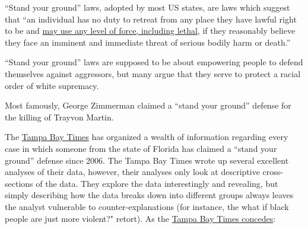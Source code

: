 \documentclass[12pt,article]{article}
\begin{document}
``Stand your ground'' laws, adopted by most US states, are laws which
suggest that ``an individual has no duty to retreat from any place they
have lawful right to be and
\href{http://en.wikipedia.org/wiki/Stand-your-ground_law}{may use any
level of force, including lethal}, if they reasonably believe they face
an imminent and immediate threat of serious bodily harm or death.''

``Stand your ground'' laws are supposed to be about empowering people to
defend themselves against aggressors, but many argue that they serve to
protect a racial order of white supremacy.

Most famously, George Zimmerman claimed a ``stand your ground'' defense
for the killing of Trayvon Martin.

The \href{http://www.tampabay.com/stand-your-ground-law}{Tampa Bay
Times} has organized a wealth of information regarding every case in
which someone from the state of Florida has claimed a ``stand your
ground'' defense since 2006. The Tampa Bay Times wrote up several
excellent analyses of their data, however, their analyses only look at
descriptive cross-sections of the data. They explore the data
interestingly and revealing, but simply describing how the data breaks
down into different groups always leaves the analyst vulnerable to
counter-explanations (for instance, the what if black people are just
more violent?" retort). As the
\href{http://www.tampabay.com/news/courts/criminal/race-plays-complex-role-in-floridas-stand-your-ground-law/1233152}{Tampa
Bay Times concedes}:
\end{document}
